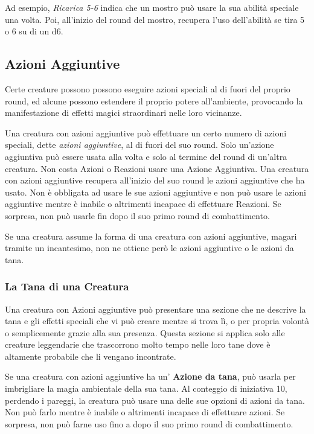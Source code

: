\begin{multicols}{2}
Ad esempio, \emph{Ricarica 5-6} indica che un mostro può usare la sua abilità speciale una volta. Poi, all'inizio del round del mostro, recupera l'uso dell'abilità se tira 5 o 6 su di un d6.

\subsection{Azioni Aggiuntive}

Certe creature possono possono eseguire azioni speciali al di fuori del proprio round, ed alcune possono estendere il proprio potere all'ambiente, provocando la manifestazione di effetti magici straordinari nelle loro vicinanze.

Una creatura con azioni aggiuntive può effettuare un certo numero di azioni speciali, dette \emph{azioni aggiuntive}, al di fuori del suo round. Solo un'azione aggiuntiva può essere usata alla volta e solo al termine del round di un'altra creatura. Non costa Azioni o Reazioni usare una Azione Aggiuntiva. Una creatura con azioni aggiuntive recupera all'inizio del suo round le azioni aggiuntive che ha usato. Non è obbligata ad usare le sue azioni aggiuntive e non può usare le azioni aggiuntive mentre è inabile o altrimenti incapace di effettuare Reazioni. Se sorpresa, non può usarle fin dopo il suo primo round di combattimento.

Se una creatura assume la forma di una creatura con azioni aggiuntive, magari tramite un incantesimo, non ne ottiene però le azioni aggiuntive o le azioni da tana.

\subsubsection{La Tana di una Creatura}

Una creatura con Azioni aggiuntive può presentare una sezione che ne descrive la tana e gli effetti speciali che vi può creare mentre si trova lì, o per propria volontà o semplicemente grazie alla sua presenza. Questa sezione si applica solo alle creature leggendarie che trascorrono molto tempo nelle loro tane dove è altamente probabile che li vengano incontrate.

Se una creatura con azioni aggiuntive ha un' \textbf{Azione da tana}, può usarla per imbrigliare la magia ambientale della sua tana. Al conteggio di iniziativa 10, perdendo i pareggi, la creatura può usare una delle sue opzioni di azioni da tana. Non può farlo mentre è inabile o altrimenti incapace di effettuare azioni. Se sorpresa, non può farne uso fino a dopo il suo primo round di combattimento.


\end{multicols}

